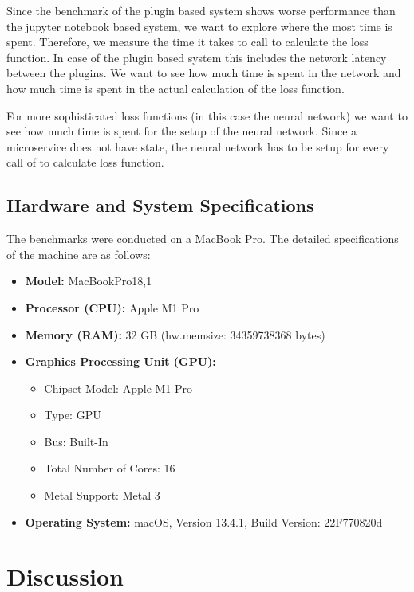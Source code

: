 \documentclass[
  a4paper,  %
  twoside,  %
  bibliography=totoc,
  headsepline,
  cleardoublepage=empty,
  parskip=half,
  draft=false
]{scrbook}
\begin{document}
Since the benchmark of the plugin based system shows worse performance than the jupyter notebook based system, we want to explore where the most time is spent.
Therefore, we measure the time it takes to call to calculate the loss function.
In case of the plugin based system this includes the network latency between the plugins.
We want to see how much time is spent in the network and how much time is spent in the actual calculation of the loss function.

For more sophisticated loss functions (in this case the neural network) we want to see how much time is spent for the setup of the neural network.
Since a microservice does not have state, the neural network has to be setup for every call of to calculate loss function.

\section{Hardware and System Specifications}

The benchmarks were conducted on a MacBook Pro. The detailed specifications of the machine are as follows:

\begin{itemize}
    \item \textbf{Model:} MacBookPro18,1
    \item \textbf{Processor (CPU):} Apple M1 Pro
    \item \textbf{Memory (RAM):} 32 GB (hw.memsize: 34359738368 bytes)
    \item \textbf{Graphics Processing Unit (GPU):}
    \begin{itemize}
        \item Chipset Model: Apple M1 Pro
        \item Type: GPU
        \item Bus: Built-In
        \item Total Number of Cores: 16
        \item Metal Support: Metal 3
    \end{itemize}
    \item \textbf{Operating System:} macOS, Version 13.4.1, Build Version: 22F770820d
\end{itemize}




\chapter{Discussion}
\label{chap:discussion}
\end{document}
